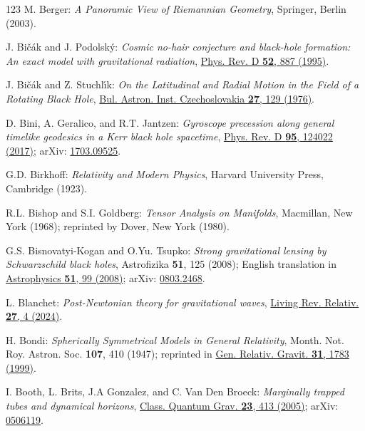 \begin{thebibliography}{123}
M. Berger: {\em A Panoramic View of Riemannian Geometry},
Springer, Berlin (2003).

J. Bi\v{c}\'{a}k and J. Podolský:
{\em Cosmic no-hair conjecture and black-hole formation: An exact model with gravitational radiation},
\href{https://doi.org/10.1103/PhysRevD.52.887}{Phys. Rev. D {\bf 52}, 887 (1995)}.

J. Bi\v{c}\'{a}k and Z. Stuchl\'{\i}k:
{\em On the Latitudinal and Radial Motion in the Field of a Rotating Black Hole},
\href{https://ui.adsabs.harvard.edu/abs/1976BAICz..27..129B}{Bul. Astron. Inst. Czechoslovakia {\bf 27}, 129 (1976)}.

D. Bini, A. Geralico, and R.T. Jantzen:
{\em Gyroscope precession along general timelike geodesics in a Kerr black hole spacetime},
\href{https://doi.org/10.1103/PhysRevD.95.124022}{Phys. Rev. D {\bf 95}, 124022 (2017)};
arXiv: \href{https://arxiv.org/abs/1703.09525}{1703.09525}.

G.D. Birkhoff:
{\em Relativity and Modern Physics},
Harvard University Press, Cambridge (1923).

R.L. Bishop and S.I. Goldberg:
{\em Tensor Analysis on Manifolds},
Macmillan, New York (1968); reprinted by Dover, New York (1980).

G.S. Bisnovatyi-Kogan and O.Yu. Tsupko:
{\em Strong gravitational lensing by Schwarzschild black holes},
Astrofizika {\bf 51}, 125 (2008); English translation in
\href{https://doi.org/10.1007/s10511-008-0011-8}{Astrophysics {\bf 51}, 99 (2008)};
arXiv: \href{https://arxiv.org/abs/0803.2468}{0803.2468}.

L. Blanchet:
{\em Post-Newtonian theory for gravitational waves},
\href{https://doi.org/10.1007/s41114-024-00050-z}{Living Rev. Relativ. {\bf 27}, 4 (2024)}.

H. Bondi:
{\em Spherically Symmetrical Models in General Relativity},
Month. Not. Roy. Astron. Soc. {\bf 107}, 410 (1947);
reprinted in
\href{https://doi.org/10.1023/A:1026726520289}{Gen. Relativ. Gravit. {\bf 31}, 1783 (1999)}.

I. Booth, L. Brits, J.A Gonzalez, and C. Van Den Broeck:
{\em Marginally trapped tubes and dynamical horizons},
\href{https://doi.org/10.1088/0264-9381/23/2/009}{Class. Quantum Grav. {\bf 23}, 413 (2005)};
arXiv: \href{https://arxiv.org/abs/gr-qc/0506119}{0506119}.


\end{thebibliography}
